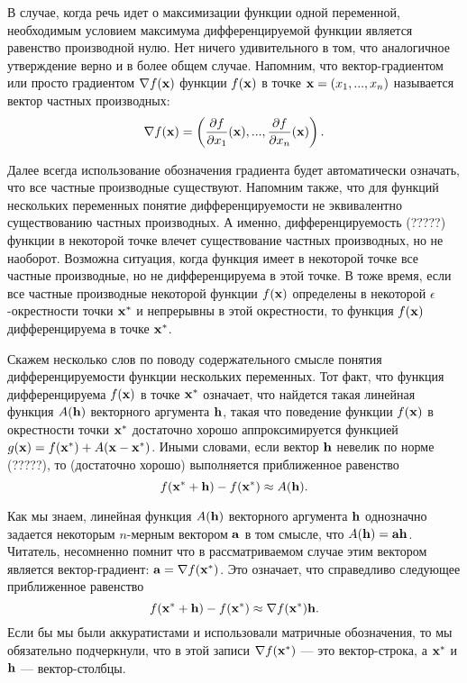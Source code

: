     В случае, когда речь идет о максимизации функции одной
    переменной, необходимым условием максимума дифференцируемой
    функции является равенство производной нулю. Нет ничего
    удивительного в том, что аналогичное утверждение верно и в более
    общем случае. Напомним, что вектор-градиентом или просто
    градиентом $\nabla f(\mathbf{x})$
    функции $f(\mathbf{x})$ в точке $\mathbf{x}=(x_{1},...,x_{n})$
    называется вектор частных производных:
    \[\nabla f(\mathbf{x})=
    \left(\frac{\partial f}{\partial x_{1}}(\mathbf{x}),...,
    \frac{\partial f}{\partial x_{n}}(\mathbf{x})\right).\]

    Далее всегда использование обозначения градиента будет
    автоматически означать, что все частные производные существуют.
    Напомним также, что для функций нескольких переменных понятие
    дифференцируемости не эквивалентно существованию частных
    производных. А именно, дифференцируемость (?????) функции в некоторой
    точке влечет существование частных производных, но не наоборот.
    Возможна ситуация, когда функция имеет в некоторой точке все
    частные производные, но не дифференцируема в этой точке. В тоже
    время, если все частные производные некоторой функции
    $f(\mathbf{x})$ определены в некоторой $\epsilon$-окрестности точки
    $\mathbf{x^{*}}$ и непрерывны в этой окрестности, то функция
    $f(\mathbf{x})$ дифференцируема в точке $\mathbf{x^{*}}$.

    Скажем несколько слов по поводу содержательного смысле понятия
    дифференцируемости функции нескольких переменных. Тот факт, что
    функция дифференцируема $f(\mathbf{x})$ в точке $\mathbf{x^{*}}$
    означает, что найдется такая линейная функция $A(\mathbf{h})$
    векторного аргумента $\mathbf{h}$, такая что поведение функции
    $f(\mathbf{x})$ в окрестности точки $\mathbf{x^{*}}$ достаточно хорошо
    аппроксимируется функцией
    $g(\mathbf{x})=f(\mathbf{x^{*}})+A(\mathbf{x}-\mathbf{x^{*}})$.
    Иными словами, если вектор $\mathbf{h}$ невелик по норме
    (?????), то (достаточно хорошо) выполняется приближенное равенство
    \[f(\mathbf{x^{*}}+\mathbf{h})-f(\mathbf{x^{*}})\approx A(\mathbf{h}).\]

    Как мы знаем, линейная функция $A(\mathbf{h})$
    векторного аргумента $\mathbf{h}$ однозначно задается некоторым
    $n$-мерным вектором $\mathbf{a}$ в том смысле, что $A(\mathbf{h})=\mathbf{a}\mathbf{h}$.
    Читатель, несомненно  помнит что в
    рассматриваемом случае этим вектором является вектор-градиент:
    $\mathbf{a}=\nabla f(\mathbf{x^{*}})$. Это означает, что справедливо следующее
    приближенное равенство
    \[f(\mathbf{x^{*}}+\mathbf{h})-f(\mathbf{x^{*}})\approx \nabla f(\mathbf{x^{*}})\mathbf{h}.\]
    Если бы мы были аккуратистами и использовали
    матричные обозначения, то мы обязательно подчеркнули, что в этой
    записи $\nabla f(\mathbf{x^{*}})$ --- это вектор-строка, а
    $\mathbf{x^{*}}$ и $\mathbf{h}$ --- вектор-столбцы.


